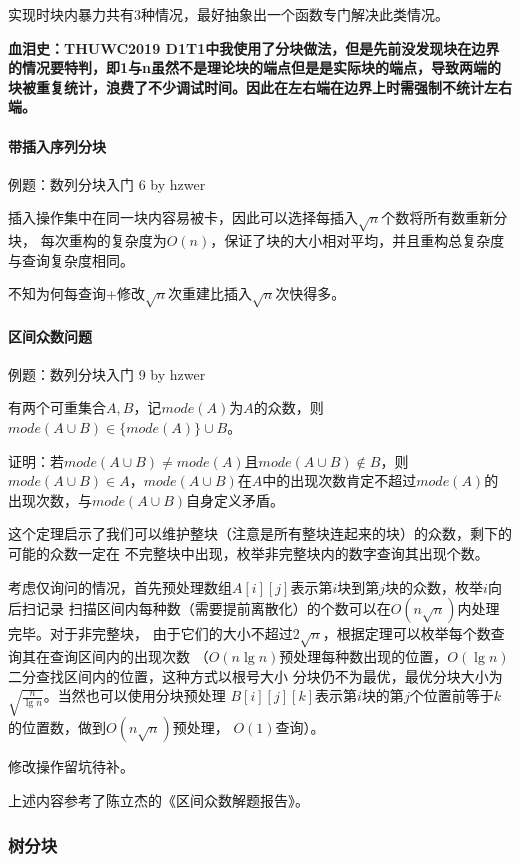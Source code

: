 实现时块内暴力共有3种情况，最好抽象出一个函数专门解决此类情况。

{\bfseries 血泪史：THUWC2019 D1T1中我使用了分块做法，但是先前没发现块在边界的情况要特判，即1与n虽然不是理论块的端点但是是实际块的端点，导致两端的块被重复统计，浪费了不少调试时间。因此在左右端在边界上时需强制不统计左右端。}
\paragraph{带插入序列分块}

例题：数列分块入门 6 by hzwer

插入操作集中在同一块内容易被卡，因此可以选择每插入$\sqrt{n}$个数将所有数重新分块，
每次重构的复杂度为$O(n)$，保证了块的大小相对平均，并且重构总复杂度与查询复杂度相同。

不知为何每查询+修改$\sqrt{n}$次重建比插入$\sqrt{n}$次快得多。
\paragraph{区间众数问题}

例题：数列分块入门 9 by hzwer

\begin{theorem}
	有两个可重集合$A,B$，记$mode(A)$为$A$的众数，则
	$mode(A\cup B)\in \{mode(A)\}\cup B$。
\end{theorem}

证明：若$mode(A\cup B)\neq mode(A)$且$mode(A\cup B)\not \in B$，则
$mode(A\cup B)\in A$，$mode(A\cup B)$在$A$中的出现次数肯定不超过$mode(A)$的
出现次数，与$mode(A\cup B)$自身定义矛盾。

这个定理启示了我们可以维护整块（注意是所有整块连起来的块）的众数，剩下的可能的众数一定在
不完整块中出现，枚举非完整块内的数字查询其出现个数。

考虑仅询问的情况，首先预处理数组$A[i][j]$表示第$i$块到第$j$块的众数，枚举$i$向后扫记录
扫描区间内每种数（需要提前离散化）的个数可以在$O(n\sqrt{n})$内处理完毕。对于非完整块，
由于它们的大小不超过$2\sqrt{n}$，根据定理可以枚举每个数查询其在查询区间内的出现次数
（$O(n\lg n)$预处理每种数出现的位置，$O(\lg n)$二分查找区间内的位置，这种方式以根号大小
分块仍不为最优，最优分块大小为$\sqrt{\frac{n}{\lg n}}$。当然也可以使用分块预处理
$B[i][j][k]$表示第$i$块的第$j$个位置前等于$k$的位置数，做到$O(n\sqrt{n})$预处理，
$O(1)$查询）。

修改操作留坑待补。

上述内容参考了陈立杰的《区间众数解题报告》。
\subsubsection{树分块}
